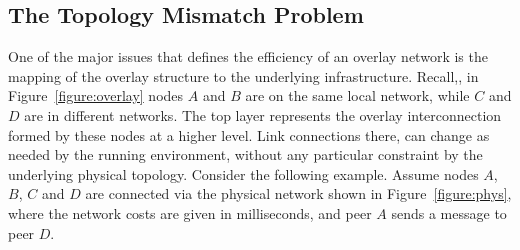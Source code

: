 %
%





\subsection{The Topology Mismatch Problem}

One of the major issues that defines the efficiency of an overlay network is the
mapping of the overlay structure to the underlying infrastructure. Recall,, in
Figure~\ref{figure:overlay} nodes $A$ and $B$ are on the same local network,
while $C$ and $D$ are in different networks. The top layer represents the
overlay interconnection formed by these nodes at a higher level. Link
connections there, can change as needed by the running environment, without any
particular constraint by the underlying physical topology. Consider the following
example. 
Assume nodes $A$, $B$, $C$ and $D$ are
connected via the physical network shown in Figure~\ref{figure:phys}, where
the network costs are given in milliseconds, and peer $A$ sends a message to
peer $D$.

